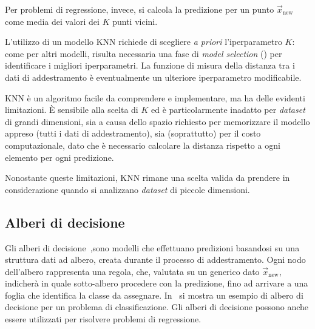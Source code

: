 Per problemi di regressione, invece, si calcola la predizione per un punto $\Vec{x}_\text{new}$ come media dei valori dei $K$ punti vicini.

L'utilizzo di un modello KNN richiede di scegliere \emph{a priori} l'iperparametro $K$:
come per altri modelli, risulta necessaria una fase di \emph{model selection} () per identificare i migliori iperparametri.
La funzione di misura della distanza tra i dati di addestramento è eventualmente un ulteriore iperparametro modificabile.

KNN è un algoritmo facile da comprendere e implementare, ma ha delle evidenti limitazioni. 
\`E sensibile alla scelta di $K$ ed è particolarmente inadatto per \emph{dataset} di grandi dimensioni, sia a causa dello spazio richiesto per memorizzare il modello appreso (tutti i dati di addestramento), sia (soprattutto) per il costo computazionale, dato che è necessario calcolare la distanza rispetto a ogni elemento per ogni predizione.

Nonostante queste limitazioni, KNN rimane una scelta valida da prendere in considerazione quando si analizzano \emph{dataset} di piccole dimensioni.

\subsection{Alberi di decisione}
Gli alberi di decisione~\cite{decision_tree},sono modelli che effettuano predizioni basandosi su una struttura dati ad albero, creata durante il processo di addestramento. 
Ogni nodo dell'albero rappresenta una regola, che, valutata su un generico dato $\Vec{x}_\text{new}$, indicherà in quale sotto-albero procedere con la predizione, fino ad arrivare a una foglia che identifica la classe da assegnare. 
In~ si mostra un esempio di albero di decisione per un problema di classificazione.
Gli alberi di decisione possono anche essere utilizzati per risolvere problemi di regressione.

